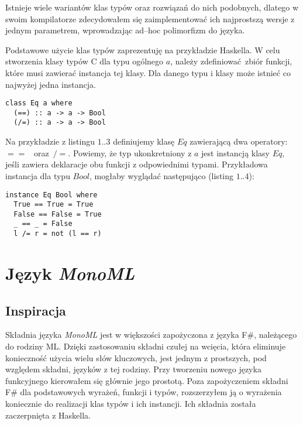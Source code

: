 \documentclass[declaration,shortabstract]{iithesis}
\begin{document}

Istnieje wiele wariantów klas typów oraz rozwiązań do nich podobnych, dlatego w swoim 
kompilatorze zdecydowałem się zaimplementować ich najprostszą wersje z jednym 
parametrem, wprowadzając ad--hoc polimorfizm do języka.

Podstawowe użycie klas typów zaprezentuję na przykładzie Haskella. 
W celu stworzenia klasy typów C dla typu ogólnego $a$, należy 
zdefiniować zbiór funkcji, które musi zawierać instancja tej klasy. Dla danego 
typu i klasy może istnieć co najwyżej jedna instancja. 

\begin{lstlisting}[frame=single, caption=Przykładowa definicja klasy typów.]
class Eq a where
  (==) :: a -> a -> Bool
  (/=) :: a -> a -> Bool
\end{lstlisting}

Na przykładzie z listingu $1..3$ definiujemy klasę $Eq$ zawierającą dwa operatory:~$==$ 
~oraz~$/=$. Powiemy, że typ ukonkretniony z $a$ jest instancją klasy $Eq$, 
jeśli zawiera deklaracje obu funkcji z odpowiednimi typami. Przykładowa 
instancja dla typu $Bool$, mogłaby wyglądać następująco (listing $1..4$):

\begin{lstlisting}[frame=single, caption=Instancja klasy $Eq$ dla typu $Bool$.]
instance Eq Bool where
  True == True = True 
  False == False = True 
  _ == _ = False
  l /= r = not (l == r)
\end{lstlisting}

\chapter{Język \textit{MonoML}}

\section{Inspiracja}
Składnia języka \textit{MonoML} jest w większości zapożyczona z języka F\#, należącego
do rodziny ML. Dzięki zastosowaniu składni czułej na wcięcia, która eliminuje 
konieczność użycia wielu słów kluczowych, jest jednym z prostszych, pod względem 
składni, języków z tej rodziny. Przy tworzeniu nowego języka funkcyjnego kierowałem się głównie 
jego prostotą. Poza zapożyczeniem składni F\# dla podstawowych wyrażeń,
funkcji i typów, rozszerzyłem ją o wyrażenia koniecznie do realizacji klas 
typów i ich instancji. Ich składnia została zaczerpnięta z Haskella.
\end{document}
